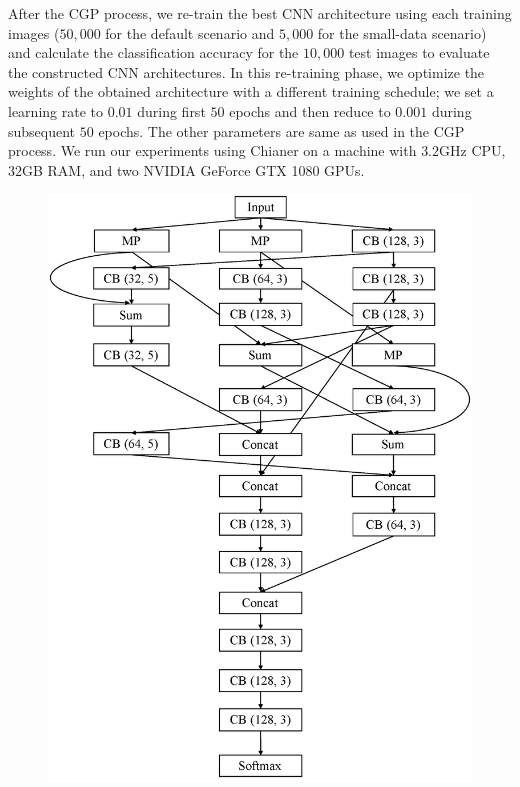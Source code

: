 After the CGP process, we re-train the best CNN architecture using each training images ($50,000$ for the default scenario and $5,000$ for the small-data scenario) and calculate the classification accuracy for the $10,000$ test images to evaluate the constructed CNN architectures.
In this re-training phase, we optimize the weights of the obtained architecture with a different training schedule; we set a learning rate to $0.01$ during first $50$ epochs and then reduce to $0.001$ during subsequent $50$ epochs. The other parameters are same as used in the CGP process.
We run our experiments using Chianer \cite{tokui_chainer:_2015} on a machine with $3.2$GHz CPU, $32$GB RAM, and two NVIDIA GeForce GTX 1080 GPUs.



\begin{figure}[!t]
 \begin{minipage}[b]{0.45\linewidth}
  \centering
  \includegraphics[keepaspectratio, scale=0.4]{images/modelA.eps}

\end{minipage}
\end{figure}
